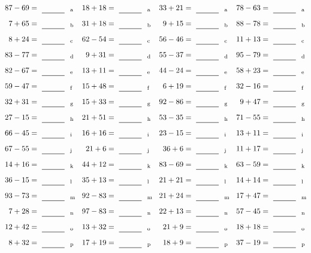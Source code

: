 \documentclass
[
  draft    = true,
  fontsize = 11pt,
  parskip  = half-
]
{scrartcl}
\begin{document}
\clearpage
\begin{align*}
    \pline{87-69}&=\rline{a}
  & \pline{18+18}&=\rline{a}
  & \pline{33+21}&=\rline{a}
  & \pline{78-63}&=\rline{a} \\[1ex]
    \pline{7+65}&=\rline{b}
  & \pline{31+18}&=\rline{b}
  & \pline{9+15}&=\rline{b}
  & \pline{88-78}&=\rline{b} \\[1ex]
    \pline{8+24}&=\rline{c}
  & \pline{62-54}&=\rline{c}
  & \pline{56-46}&=\rline{c}
  & \pline{11+13}&=\rline{c} \\[1ex]
    \pline{83-77}&=\rline{d}
  & \pline{9+31}&=\rline{d}
  & \pline{55-37}&=\rline{d}
  & \pline{95-79}&=\rline{d} \\[1ex]
    \pline{82-67}&=\rline{e}
  & \pline{13+11}&=\rline{e}
  & \pline{44-24}&=\rline{e}
  & \pline{58+23}&=\rline{e} \\[1ex]
    \pline{59-47}&=\rline{f}
  & \pline{15+48}&=\rline{f}
  & \pline{6+19}&=\rline{f}
  & \pline{32-16}&=\rline{f} \\[1ex]
    \pline{32+31}&=\rline{g}
  & \pline{15+33}&=\rline{g}
  & \pline{92-86}&=\rline{g}
  & \pline{9+47}&=\rline{g} \\[1ex]
    \pline{27-15}&=\rline{h}
  & \pline{21+51}&=\rline{h}
  & \pline{53-35}&=\rline{h}
  & \pline{71-55}&=\rline{h} \\[1ex]
    \pline{66-45}&=\rline{i}
  & \pline{16+16}&=\rline{i}
  & \pline{23-15}&=\rline{i}
  & \pline{13+11}&=\rline{i} \\[1ex]
    \pline{67-55}&=\rline{j}
  & \pline{21+6}&=\rline{j}
  & \pline{36+6}&=\rline{j}
  & \pline{11+17}&=\rline{j} \\[1ex]
    \pline{14+16}&=\rline{k}
  & \pline{44+12}&=\rline{k}
  & \pline{83-69}&=\rline{k}
  & \pline{63-59}&=\rline{k} \\[1ex]
    \pline{36-15}&=\rline{l}
  & \pline{35+13}&=\rline{l}
  & \pline{21+21}&=\rline{l}
  & \pline{14+14}&=\rline{l} \\[1ex]
    \pline{93-73}&=\rline{m}
  & \pline{92-83}&=\rline{m}
  & \pline{21+24}&=\rline{m}
  & \pline{17+47}&=\rline{m} \\[1ex]
    \pline{7+28}&=\rline{n}
  & \pline{97-83}&=\rline{n}
  & \pline{22+13}&=\rline{n}
  & \pline{57-45}&=\rline{n} \\[1ex]
    \pline{12+42}&=\rline{o}
  & \pline{13+32}&=\rline{o}
  & \pline{21+9}&=\rline{o}
  & \pline{18+18}&=\rline{o} \\[1ex]
    \pline{8+32}&=\rline{p}
  & \pline{17+19}&=\rline{p}
  & \pline{18+9}&=\rline{p}
  & \pline{37-19}&=\rline{p}
\end{align*}
\end{document}
